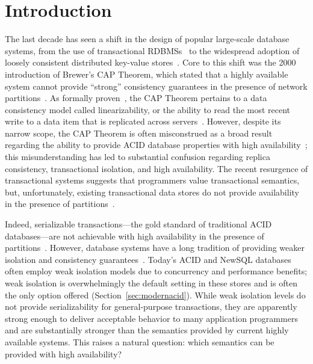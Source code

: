 
\section{Introduction}

The last decade has seen a shift in the design of popular large-scale
database systems, from the use of transactional
RDBMSs~\cite{bernstein-book, gray-isolation, gray-virtues} to the
widespread adoption of loosely consistent distributed key-value
stores~\cite{bigtable, pnuts, dynamo}. Core to this shift was the 2000
introduction of Brewer's CAP Theorem, which stated that a highly
available system cannot provide ``strong'' consistency guarantees in
the presence of network partitions~\cite{brewer-slides}. As formally
proven~\cite{gilbert-cap}, the CAP Theorem pertains to a data
consistency model called linearizability, or the ability to read the
most recent write to a data item that is replicated across
servers~\cite{herlihy-art}. However, despite its narrow scope, the CAP
Theorem is often misconstrued as a broad result regarding the ability
to provide ACID database properties with high
availability~\cite{hat-hotos,brewer-slides, foundation-article}; this
misunderstanding has led to substantial confusion regarding replica
consistency, transactional isolation, and high availability. The
recent resurgence of transactional systems suggests that programmers
value transactional semantics, but, unfortunately, existing
transactional data stores do not provide availability in the presence
of partitions~\cite{orleans,foundation-article, hstore,spanner,eiger,
  walter,calvin}.

Indeed, serializable transactions---the gold standard of traditional
ACID databases---are not achievable with high availability in the
presence of partitions~\cite{davidson-survey}. However, database
systems have a long tradition of providing weaker isolation and
consistency guarantees~\cite{adya, ansicritique, gray-virtues,
  gray-isolation, kemme-thesis}. Today's ACID and NewSQL databases
often employ weak isolation models due to concurrency and performance
benefits; weak isolation is overwhelmingly the default setting in
these stores and is often the only option offered
(Section~\ref{sec:modernacid}). While weak isolation levels do not
provide serializability for general-purpose transactions, they are
apparently strong enough to deliver acceptable behavior to many
application programmers and are substantially stronger than the
semantics provided by current highly available systems. This raises a
natural question: which semantics can be provided with high
availability?

